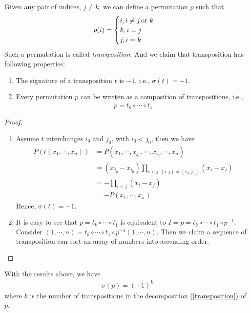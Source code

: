 \documentclass[11pt]{book}
\theoremstyle{definition}
\numberwithin{equation}{chapter}
\begin{document}
Given any pair of indices, $j\neq k$, we can define a permutation $p$ such that
\begin{align*}
    p(i) = \begin{cases}
    i, i\neq j\, {\rm or}\,\, k \\
    k, i = j \\
    j, i = k
    \end{cases}
\end{align*}
Such a permutation is called \emph{transposition}. And we claim that transposition has following properties:
\begin{enumerate}[label=(\alph*)]
    \item The signature of a transposition $t$ is $-1$, i.e., $\sigma(t) = -1$.
    \item Every permutation $p$ can be written as a composition of transpositions, i.e., 
    \begin{align}\label{transposition}
        p = t_k\circ \cdots \circ t_1
    \end{align}
\end{enumerate}
\begin{proof}
~\begin{enumerate}[label=(\alph*)]
    \item Assume $t$ interchanges $i_0$ and $j_0$, with $i_0<j_0$, then we have
    \begin{align*}
        P\left(t(x_1,\cdots,x_n)\right) & = P(x_1,\cdots,x_{j_0},\cdots,x_{i_0},\cdots,x_n) \\
        & = (x_{j_0} - x_{i_0})\prod_{i<j,(i,j)\neq(i_0,j_0)} (x_i - x_j) \\
        & = - \prod_{i<j}(x_i - x_j) \\
        & = - P(x_1,\cdots,x_n)
    \end{align*}
    Hence, $\sigma(t) = -1$.
    \item It is easy to see that $p = t_k\circ \cdots \circ t_1$ is equivalent to $I = p = t_k\circ \cdots \circ t_1 \circ p^{-1}$. Consider $(1,\cdots, n) = t_k\circ \cdots \circ t_1 \circ p^{-1}(1,\cdots,n)$. Then we claim a sequence of transposition can sort an array of numbers into ascending order.
\end{enumerate}
\end{proof}

With the results above, we have
\begin{align*}
    \sigma(p) = (-1)^{k}
\end{align*}
where $k$ is the number of transpositions in the decomposition (\ref{transposition}) of $p$.
\end{document}

